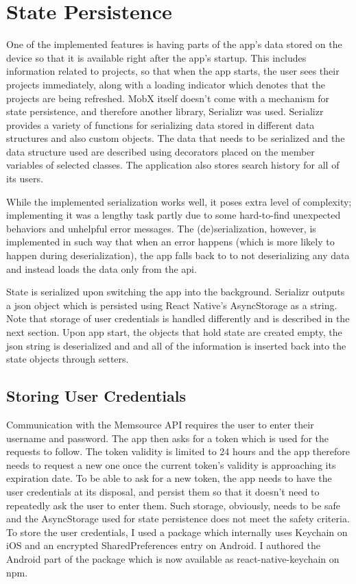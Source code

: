 \section{State Persistence}

One of the implemented features is having parts of the app's data stored on the device so that it is available right after the app’s startup. This includes information related to projects, so that when the app starts, the user sees their projects immediately, along with a loading indicator which denotes that the projects are being refreshed. MobX itself doesn't come with a mechanism for state persistence, and therefore another library, Serializr was used. Serializr provides a variety of functions for serializing data stored in different data structures and also custom objects. The data that needs to be serialized and the data structure used are described using decorators placed on the member variables of selected classes. The application also stores search history for all of its users. 

While the implemented serialization works well, it poses extra level of complexity; implementing it was a lengthy task partly due to some hard-to-find unexpected behaviors and unhelpful error messages. The (de)serialization, however, is implemented in such way that when an error happens (which is more likely to happen during deserialization), the app falls back to to not deserializing any data and instead loads the data only from the api.


State is serialized upon switching the app into the background. Serializr outputs a json object which is persisted using React Native’s AsyncStorage as a string. Note that storage of user credentials is handled differently and is described in the next section. Upon app start, the objects that hold state are created empty, the json string is deserialized and and all of the information is inserted back into the state objects through setters. 


\subsection{Storing User Credentials}

Communication with the Memsource API requires the user to enter their username and password. The app then asks for a token which is used for the requests to follow. The token validity is limited to 24 hours and the app therefore needs to request a new one once the current token's validity is approaching its expiration date. To be able to ask for a new token, the app needs to have the user credentials at its disposal, and persist them so that it doesn't need to repeatedly ask the user to enter them. Such storage, obviously, needs to be safe and the AsyncStorage used for state persistence does not meet the safety criteria. To store the user credentials, I used a package which internally uses Keychain on iOS and an encrypted SharedPreferences entry on Android. I authored the Android part of the package which is now available as react-native-keychain on npm. 

